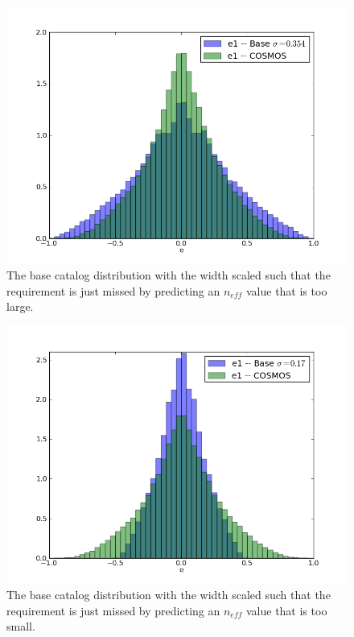 \documentclass[]{article}
\begin{document}
{\begin{figure}[H]
\centering
  \includegraphics[width=5in]{validation_figures/e1_hist_s_354.png}
\caption{The base catalog distribution with the width scaled such that the requirement is just missed by predicting an $n_{eff}$ value that is too large.\label{fig:ellip_errbig}}
\end{figure}
\begin{figure}[H]
\centering
  \includegraphics[width=5in]{validation_figures/e1_hist_s_17.png}
\caption{The base catalog distribution with the width scaled such that the requirement is just missed by predicting an $n_{eff}$ value that is too small.\label{fig:ellip_errbig}}
\end{figure}

}
\end{document}
